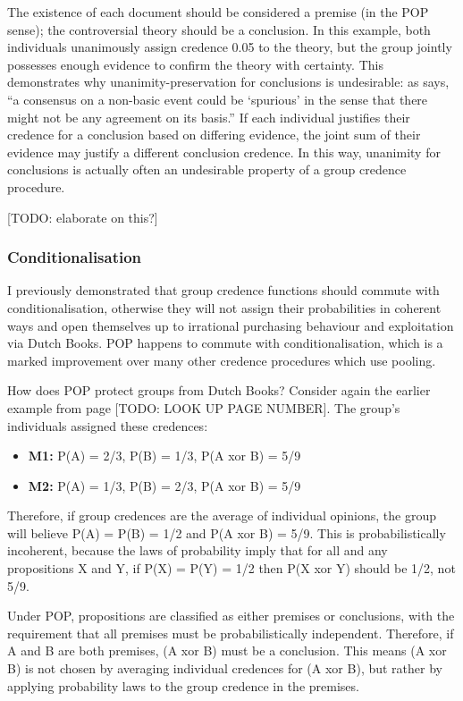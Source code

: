 \documentclass{article}
\begin{document}
\noindent
The existence of each document should be considered a premise (in the POP sense); the controversial theory should be a conclusion. In this example, both individuals unanimously assign credence 0.05 to the theory, but the group jointly possesses enough evidence to confirm the theory with certainty. This demonstrates why unanimity-preservation for conclusions is undesirable: as \citet{dietrich2013probabilistic} says, ``a consensus on a non-basic event could be `spurious' in the sense that there might not be any agreement on its basis.'' If each individual justifies their credence for a conclusion based on differing evidence, the joint sum of their evidence may justify a different conclusion credence. In this way, unanimity for conclusions is actually often an undesirable property of a group credence procedure.

[TODO: elaborate on this?]

\subsubsection{Conditionalisation}

I previously demonstrated that group credence functions should commute with conditionalisation, otherwise they will not assign their probabilities in coherent ways and open themselves up to irrational purchasing behaviour and exploitation via Dutch Books. POP happens to commute with conditionalisation, which is a marked improvement over many other credence procedures which use pooling.

How does POP protect groups from Dutch Books? Consider again the earlier example from page [TODO: LOOK UP PAGE NUMBER]. The group's individuals assigned these credences:

\begin{itemize}
	\item \textbf{M1:} P(A) = 2/3, P(B) = 1/3, P(A xor B) = 5/9
	\item \textbf{M2:} P(A) = 1/3, P(B) = 2/3, P(A xor B) = 5/9
\end{itemize}

\noindent
Therefore, if group credences are the average of individual opinions, the group will believe P(A) = P(B) = 1/2 and P(A xor B) = 5/9. This is probabilistically incoherent, because the laws of probability imply that for all and any propositions X and Y, if P(X) = P(Y) = 1/2 then P(X xor Y) should be 1/2, not 5/9.

Under POP, propositions are classified as either premises or conclusions, with the requirement that all premises must be probabilistically independent. Therefore, if A and B are both premises, (A xor B) must be a conclusion. This means (A xor B) is not chosen by averaging individual credences for (A xor B), but rather by applying probability laws to the group credence in the premises.
\end{document}
